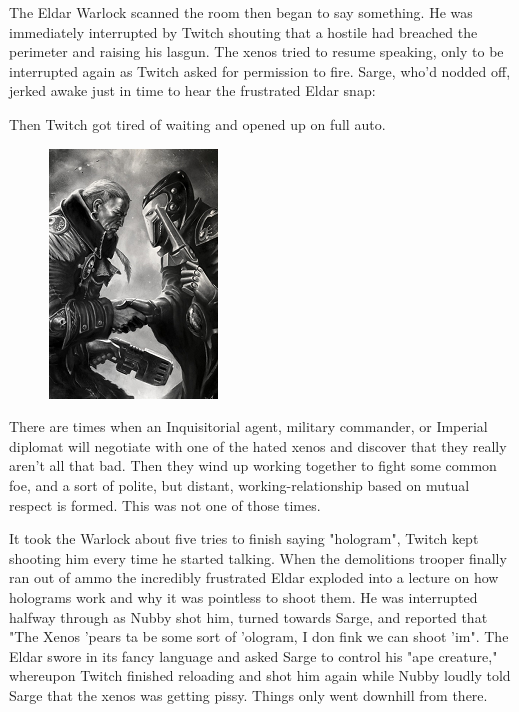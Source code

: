 The Eldar Warlock scanned the room then began to say something. 
He was immediately interrupted by Twitch shouting that a hostile had breached the perimeter and raising his lasgun. 
The xenos tried to resume speaking, only to be interrupted again as Twitch asked for permission to fire. 
Sarge, who'd nodded off, jerked awake just in time to hear the frustrated Eldar snap: 




Then Twitch got tired of waiting and opened up on full auto.
\begin{figure}
	\begin{center}
		\includegraphics[width=\figwidth]{pics/11/58.png}
	\end{center}
\end{figure}
There are times when an Inquisitorial agent, military commander, or Imperial diplomat will negotiate with one of the hated xenos and discover that they really aren't all that bad. 
Then they wind up working together to fight some common foe, and a sort of polite, but distant, working-relationship based on mutual respect is formed. 
This was not one of those times.

It took the Warlock about five tries to finish saying "hologram", Twitch kept shooting him every time he started talking. 
When the demolitions trooper finally ran out of ammo the incredibly frustrated Eldar exploded into a lecture on how holograms work and why it was pointless to shoot them. 
He was interrupted halfway through as Nubby shot him, turned towards Sarge, and reported that "The Xenos 'pears ta be some sort of 'ologram, I don fink we can shoot 'im". 
The Eldar swore in its fancy language and asked Sarge to control his "ape creature," whereupon Twitch finished reloading and shot him again while Nubby loudly told Sarge that the xenos was getting pissy. 
Things only went downhill from there.

